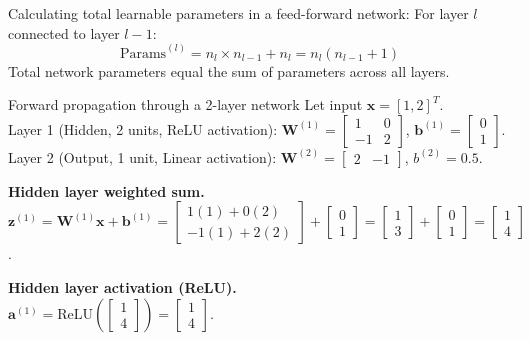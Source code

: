 \documentclass[a4paper,11pt]{article}
\begin{document}
Calculating total learnable parameters in a feed-forward network:
For layer $l$ connected to layer $l-1$:
\begin{equation}
\text{Params}^{(l)} = n_l \times n_{l-1} + n_l = n_l (n_{l-1} + 1)
\end{equation}
Total network parameters equal the sum of parameters across all layers.

\begin{worked}{Forward propagation through a 2-layer network}
Let input $\mathbf{x} = [1, 2]^T$. \\
Layer 1 (Hidden, 2 units, ReLU activation): $\mathbf{W}^{(1)} = \begin{bmatrix} 1 & 0 \\ -1 & 2 \end{bmatrix}$, $\mathbf{b}^{(1)} = \begin{bmatrix} 0 \\ 1 \end{bmatrix}$. \\
Layer 2 (Output, 1 unit, Linear activation): $\mathbf{W}^{(2)} = \begin{bmatrix} 2 & -1 \end{bmatrix}$, $b^{(2)} = 0.5$.
\begin{steps}
  \item \textbf{Hidden layer weighted sum.} \\
        $\mathbf{z}^{(1)} = \mathbf{W}^{(1)} \mathbf{x} + \mathbf{b}^{(1)} = \begin{bmatrix} 1(1) + 0(2) \\ -1(1) + 2(2) \end{bmatrix} + \begin{bmatrix} 0 \\ 1 \end{bmatrix} = \begin{bmatrix} 1 \\ 3 \end{bmatrix} + \begin{bmatrix} 0 \\ 1 \end{bmatrix} = \begin{bmatrix} 1 \\ 4 \end{bmatrix}$.
  \item \textbf{Hidden layer activation (ReLU).} \\
        $\mathbf{a}^{(1)} = \text{ReLU}\left(\begin{bmatrix} 1 \\ 4 \end{bmatrix}\right) = \begin{bmatrix} 1 \\ 4 \end{bmatrix}$.

\end{steps}
\end{worked}
\end{document}

